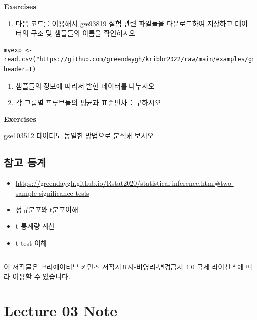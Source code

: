 \documentclass[
]{book}
\providecommand{\tightlist}{%
  \setlength{\itemsep}{0pt}\setlength{\parskip}{0pt}}
\begin{document}
\textbf{Exercises}

\begin{enumerate}
\def\labelenumi{\arabic{enumi}.}
\tightlist
\item
  다음 코드를 이용해서 gse93819 실험 관련 파일들을 다운로드하여 저장하고 데이터의 구조 및 샘플들의 이름을 확인하시오
\end{enumerate}

\begin{verbatim}
myexp <- read.csv("https://github.com/greendaygh/kribbr2022/raw/main/examples/gse93819_expression_values.csv", header=T)
\end{verbatim}

\begin{enumerate}
\def\labelenumi{\arabic{enumi}.}
\setcounter{enumi}{1}
\item
  샘플들의 정보에 따라서 발현 데이터를 나누시오
\item
  각 그룹별 프루브들의 평균과 표준편차를 구하시오
\end{enumerate}

\textbf{Exercises}

gse103512 데이터도 동일한 방법으로 분석해 보시오

\hypertarget{uxcc38uxace0-uxd1b5uxacc4}{%
\section{참고 통계}\label{uxcc38uxace0-uxd1b5uxacc4}}

\begin{itemize}
\tightlist
\item
  \url{https://greendaygh.github.io/Rstat2020/statistical-inference.html\#two-sample-significance-tests}
\item
  정규분포와 t분포이해
\item
  t 통계량 계산
\item
  t-test 이해
\end{itemize}

\begin{center}\rule{0.5\linewidth}{0.5pt}\end{center}

이 저작물은 크리에이티브 커먼즈 저작자표시-비영리-변경금지 4.0 국제 라이선스에 따라 이용할 수 있습니다.

\hypertarget{lecture-03-note}{%
\chapter{Lecture 03 Note}\label{lecture-03-note}}
\end{document}

